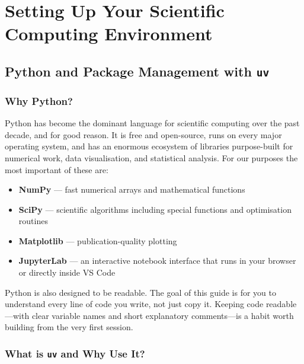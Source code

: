 \documentclass[nobib]{tufte-book}
\begin{document}
\part{Setting Up Your Scientific Computing Environment}

\chapter{Python and Package Management with \texttt{uv}}
\label{ch:python}

\section{Why Python?}

Python has become the dominant language for scientific computing over the past
decade, and for good reason.
It is free and open-source, runs on every major operating system, and has an
enormous ecosystem of libraries purpose-built for numerical work, data
visualisation, and statistical analysis.
For our purposes the most important of these are:

\begin{itemize}
    \item \textbf{NumPy} --- fast numerical arrays and mathematical functions
    \item \textbf{SciPy} --- scientific algorithms including special functions
          and optimisation routines
    \item \textbf{Matplotlib} --- publication-quality plotting
    \item \textbf{JupyterLab} --- an interactive notebook interface that runs
          in your browser or directly inside VS Code
\end{itemize}

Python is also designed to be readable.
The goal of this guide is for you to understand every line of code you write,
not just copy it.
Keeping code readable---with clear variable names and short explanatory
comments---is a habit worth building from the very first session.

\section{What is \texttt{uv} and Why Use It?}
\end{document}
